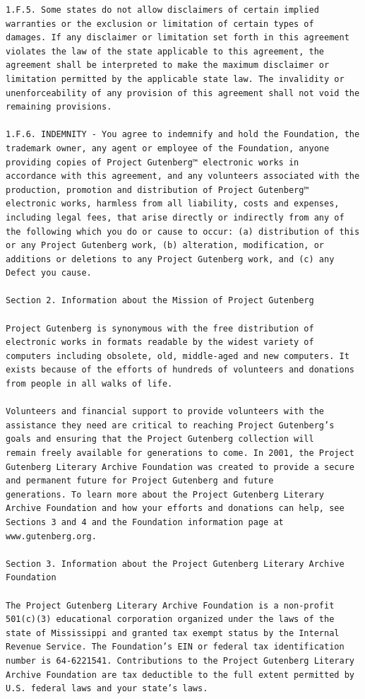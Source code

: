 \documentclass{article}
\begin{document}
\begin{verbatim}
1.F.5. Some states do not allow disclaimers of certain implied
warranties or the exclusion or limitation of certain types of
damages. If any disclaimer or limitation set forth in this agreement
violates the law of the state applicable to this agreement, the
agreement shall be interpreted to make the maximum disclaimer or
limitation permitted by the applicable state law. The invalidity or
unenforceability of any provision of this agreement shall not void the
remaining provisions.

1.F.6. INDEMNITY - You agree to indemnify and hold the Foundation, the
trademark owner, any agent or employee of the Foundation, anyone
providing copies of Project Gutenberg™ electronic works in
accordance with this agreement, and any volunteers associated with the
production, promotion and distribution of Project Gutenberg™
electronic works, harmless from all liability, costs and expenses,
including legal fees, that arise directly or indirectly from any of
the following which you do or cause to occur: (a) distribution of this
or any Project Gutenberg work, (b) alteration, modification, or
additions or deletions to any Project Gutenberg work, and (c) any
Defect you cause.

Section 2. Information about the Mission of Project Gutenberg

Project Gutenberg is synonymous with the free distribution of
electronic works in formats readable by the widest variety of
computers including obsolete, old, middle-aged and new computers. It
exists because of the efforts of hundreds of volunteers and donations
from people in all walks of life.

Volunteers and financial support to provide volunteers with the
assistance they need are critical to reaching Project Gutenberg’s
goals and ensuring that the Project Gutenberg collection will
remain freely available for generations to come. In 2001, the Project
Gutenberg Literary Archive Foundation was created to provide a secure
and permanent future for Project Gutenberg and future
generations. To learn more about the Project Gutenberg Literary
Archive Foundation and how your efforts and donations can help, see
Sections 3 and 4 and the Foundation information page at www.gutenberg.org.

Section 3. Information about the Project Gutenberg Literary Archive Foundation

The Project Gutenberg Literary Archive Foundation is a non-profit
501(c)(3) educational corporation organized under the laws of the
state of Mississippi and granted tax exempt status by the Internal
Revenue Service. The Foundation’s EIN or federal tax identification
number is 64-6221541. Contributions to the Project Gutenberg Literary
Archive Foundation are tax deductible to the full extent permitted by
U.S. federal laws and your state’s laws.


\end{verbatim}
\end{document}

